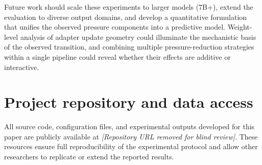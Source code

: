\documentclass[a4paper,fleqn]{cas-dc}
\begin{document}
Future work should scale these experiments to larger models (7B+), extend the
evaluation to diverse output domains, and develop a quantitative formulation
that unifies the observed pressure components into a predictive model.
Weight-level analysis of adapter update geometry could illuminate the
mechanistic basis of the observed transition, and combining multiple
pressure-reduction strategies within a single pipeline could reveal whether
their effects are additive or interactive.


\appendix

\section{Project repository and data access}\label{app:repo}

All source code, configuration files, and experimental outputs developed for
this paper are publicly available at
\textit{[Repository URL removed for blind review]}.
These resources ensure full reproducibility of the experimental protocol and
allow other researchers to replicate or extend the reported results.



\end{document}
